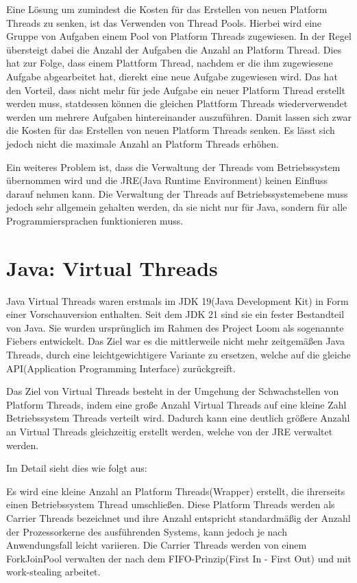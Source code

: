 \documentclass[fontsize=12pt,paper=a4,twoside=semi,parskip=half-,headsepline,headinclude]{scrreprt}
\begin{document}
Eine Lösung um zumindest die Kosten für das Erstellen von neuen Platform Threads zu senken, ist das Verwenden von Thread Pools. Hierbei wird eine Gruppe von Aufgaben einem Pool von Platform Threads zugewiesen. In der Regel übersteigt dabei die Anzahl der Aufgaben die Anzahl an Platform Thread. Dies hat zur Folge, dass einem Plattform Thread, nachdem er die ihm zugewiesene Aufgabe abgearbeitet hat, dierekt eine neue Aufgabe zugewiesen wird. Das hat den Vorteil, dass nicht mehr für jede Aufgabe ein neuer Platform Thread erstellt werden muss, statdessen können die gleichen Plattform Threads wiederverwendet werden um mehrere Aufgaben hintereinander auszuführen. Damit lassen sich zwar die Kosten für das Erstellen von neuen Platform Threads senken. Es lässt sich jedoch nicht die maximale Anzahl an Platform Threads erhöhen.

Ein weiteres Problem ist, dass die Verwaltung der Threads vom Betriebssystem über\-nommen wird und die JRE(Java Runtime Environment) keinen Einfluss darauf nehmen kann. Die Verwaltung der Threads auf Betriebssystemebene muss jedoch sehr allgemein gehalten werden, da sie nicht nur für Java, sondern für alle Programmiersprachen funktionieren muss.

\section{Java: Virtual Threads}

Java Virtual Threads waren erstmals im JDK 19(Java Development Kit) in Form einer Vorschauversion enthalten. Seit dem JDK 21 sind sie ein fester Bestandteil von Java. Sie wurden ursprünglich im Rahmen des Project Loom als sogenannte Fiebers entwickelt. Das Ziel war es die mittlerweile nicht mehr zeitgemäßen Java Threads, durch eine leichtgewichtigere Variante zu ersetzen, welche auf die gleiche API(Application Programming Interface) zurückgreift.

Das Ziel von Virtual Threads besteht in der Umgehung der Schwachstellen von Platform Threads, indem eine große Anzahl Virtual Threads auf eine kleine Zahl Betriebssystem Threads verteilt wird. Dadurch kann eine deutlich größere Anzahl an Virtual Threads gleichzeitig erstellt werden, welche von der JRE verwaltet werden.

Im Detail sieht dies wie folgt aus:

Es wird eine kleine Anzahl an Platform Threads(Wrapper) erstellt, die ihrerseits einen Betriebssystem Thread umschließen. Diese Platform Threads werden als Carrier Threads bezeichnet und ihre Anzahl entspricht standardmäßig der Anzahl der Prozessorkerne des ausführenden Systems, kann jedoch je nach Anwendungsfall leicht variieren. Die Carrier Threads werden von einem ForkJoinPool verwalten der nach dem FIFO-Prinzip(First In - First Out) und mit work-stealing arbeitet.\cite{Pressler2023a}
\end{document}
